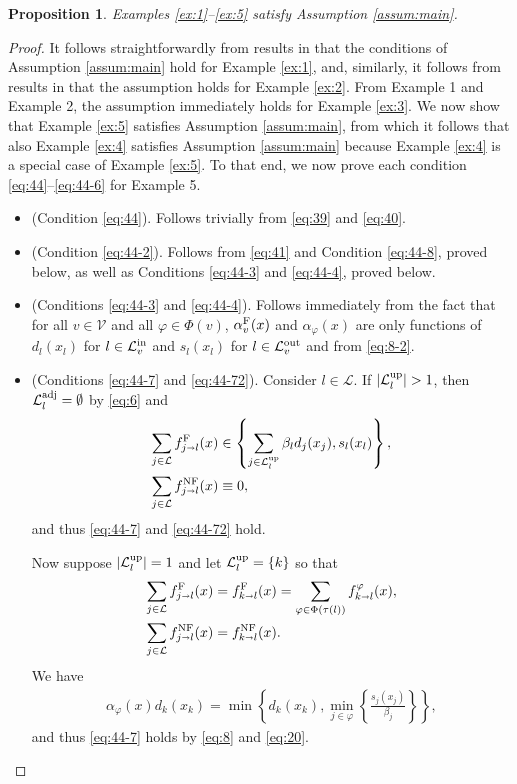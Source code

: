 \documentclass[letterpaper, 10 pt, conference]{ieeeconf}
\newcommand{\sra}{\shortrightarrow}
\newtheorem{prop}{Proposition}
\newcommand{\fluxin}{s}
\newcommand{\fluxout}{d}
\newcommand{\Verts}{\mathcal{V}}
\newcommand{\Links}{\mathcal{L}}
\newcommand{\Lin}{\mathcal{L}^\textnormal{in}}
\newcommand{\Lout}{\mathcal{L}^\textnormal{out}}
\newcommand{\Lup}{\mathcal{L}^\textnormal{up}}
\newcommand{\Ladj}{\mathcal{L}^\textnormal{adj}}
\newcommand{\tail}{{\tau}}
\newcommand{\flow}{f}
\newcommand{\alphaF}{\alpha^\textnormal{F}}
\renewcommand{\phi}{\varphi}
\begin{document}
\begin{prop}
\label{sec:examples-1}
  Examples \ref{ex:1}--\ref{ex:5} satisfy Assumption \ref{assum:main}.
\end{prop}
\begin{proof}

It follows straightforwardly from results in \cite{Lovisari:2014qv} that the conditions of Assumption \ref{assum:main} hold for Example \ref{ex:1}, and, similarly, it follows from results in \cite{Coogan:2015mz} that the assumption holds for Example \ref{ex:2}. From Example 1 and Example 2, the assumption immediately holds for Example \ref{ex:3}. We now show that Example \ref{ex:5} satisfies Assumption \ref{assum:main}, from which it follows that also Example \ref{ex:4} satisfies Assumption \ref{assum:main} because Example \ref{ex:4} is a special case of Example \ref{ex:5}. To that end, we now prove each condition \ref{eq:44}--\ref{eq:44-6} for Example 5.



\begin{itemize}[leftmargin=*]
\item    (Condition \ref{eq:44}).  Follows trivially from \eqref{eq:39} and \eqref{eq:40}.
    \item    (Condition \ref{eq:44-2}). Follows from \eqref{eq:41} and Condition \ref{eq:44-8}, proved below, as well as Conditions \ref{eq:44-3} and \ref{eq:44-4}, proved below.
    \item    (Conditions \ref{eq:44-3} and \ref{eq:44-4}). Follows immediately from the fact that for all $v\in\Verts$ and all $\phi\in\Phi(v)$, $\alphaF_v(x)$ and $\alpha_\phi(x)$ are only functions of $d_l(x_l)$ for $l\in\Lin_v$ and $s_l(x_l)$ for $l\in\Lout_v$ and from \eqref{eq:8-2}.
 \item    (Conditions \ref{eq:44-7} and \ref{eq:44-72}). 
Consider $l\in\Links$. If $|\Lup_l|>1$, then $\Ladj_l=\emptyset$ by \eqref{eq:6} and
\begin{align}
  \label{eq:19}
  \sum_{j\in\Links}\fF_{j\sra l}(x)&\in\left\{\sum_{j\in\Lup_l}{\beta_l}\fluxout_j(x_j),\fluxin_l(x_l)\right\},\\
  \sum_{j\in\Links}\fNF_{j\sra l}(x) &\equiv 0,
\end{align}
and thus \ref{eq:44-7} and \ref{eq:44-72} hold. 

Now suppose $|\Lup_l|=1$ and let $\Lup_l=\{k\}$ so that
\begin{align}
  \label{eq:20}
  \sum_{j\in\Links}\fF_{j\sra l}(x)&=\fF_{k\sra l}(x)=\sum_{\phi\in\Phi(\tail(l))}\flow^\phi_{k\sra l}(x),\\
  \sum_{j\in\Links}\fNF_{j\sra l}(x)&=\fNF_{k\sra l}(x).
\end{align}
We have 
\begin{align}
  \label{eq:23}
     \alpha_\phi(x) \fluxout_k(x_k)=\min\left\{\fluxout_k(x_k),\min_{j\in\phi}\left\{\frac{s_j(x_j)}{\beta_j}\right\}\right\},
\end{align}
and thus \ref{eq:44-7} holds by \eqref{eq:8} and \eqref{eq:20}.


\end{itemize}
\end{proof}
\end{document}
